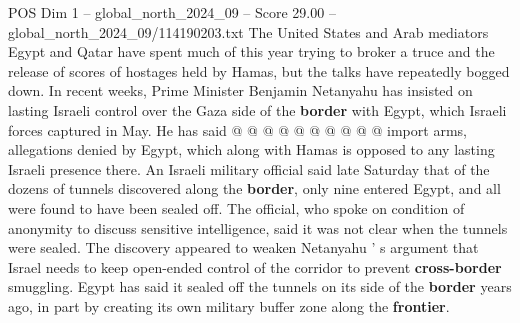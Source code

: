 \begin{textsample}{POS Dim 1 – global\_north\_2024\_09 – Score 29.00 – global\_north\_2024\_09/114190203.txt}
The United States and Arab mediators Egypt and Qatar have spent much of this year trying to broker a truce and the release of scores of hostages held by Hamas, but the talks have repeatedly bogged down.
In recent weeks, Prime Minister Benjamin Netanyahu has insisted on lasting Israeli control over the Gaza side of the \textbf{border} with Egypt, which Israeli forces captured in May.
He has said @ @ @ @ @ @ @ @ @ @ import arms, allegations denied by Egypt, which along with Hamas is opposed to any lasting Israeli presence there.
An Israeli military official said late Saturday that of the dozens of tunnels discovered along the \textbf{border}, only nine entered Egypt, and all were found to have been sealed off.
The official, who spoke on condition of anonymity to discuss sensitive intelligence, said it was not clear when the tunnels were sealed.
The discovery appeared to weaken Netanyahu ' s argument that Israel needs to keep open-ended control of the corridor to prevent \textbf{cross-border} smuggling.
Egypt has said it sealed off the tunnels on its side of the \textbf{border} years ago, in part by creating its own military buffer zone along the \textbf{frontier}.

\end{textsample}

